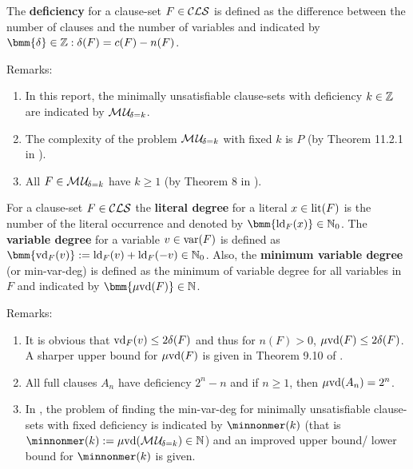 \documentclass{report}
\begin{document}
\begin{defi}\label{def:deficiency}
The \textbf{deficiency} for a clause-set $F \in \mathcal{CLS}$ is defined as the difference between the number of clauses and the number of variables and indicated by $\bmm{\delta} \in \ZZ: \delta(F)= c(F) - n(F)$.
\end{defi}
Remarks:
  \begin{enumerate}
  \item In this report, the minimally unsatisfiable clause-sets with deficiency $k \in \mathbb{Z}$ are indicated by $\mathcal{M\hspace{0.8pt}U}_{\!\delta=k}$.
  \item The complexity of the problem $\mathcal{M\hspace{0.8pt}U}_{\!\delta=k}$ with fixed $k$ is $P$ (by Theorem 11.2.1 in \cite{Kullmann2007HandbuchMU}).
  \item All $F \in \mathcal{M\hspace{0.8pt}U}_{\!\delta=k}$ have $k \ge 1$ (by Theorem 8 in \cite{DDK98}).
  \end{enumerate}

\begin{defi}\label{def:degree}
For a clause-set $F \in \mathcal{CLS}$ the \textbf{literal degree} for a literal $x \in \operatorname{lit}(F)$ is the number of the literal occurrence and denoted by $\bmm{\ldeg_F(x)} \in \NNZ$. The \textbf{variable degree} for a variable $v \in \operatorname{var}(F)$ is defined as $\bmm{\vdeg_F(v)} := \ldeg_F(v) + \ldeg_F(-v) \in \NNZ$. Also, the \textbf{minimum variable degree} (or min-var-deg) is defined as the minimum of variable degree for all variables in $F$ and indicated by $\bmm{\minvdeg(F)} \in \NN$.
\end{defi}
Remarks:
  \begin{enumerate}
  \item It is obvious that $\operatorname{vd}_F(v) \le 2 \delta(F)$ and thus for $n(F) >0$, $\operatorname{\mu\!\operatorname{vd}}(F) \le 2 \delta(F)$. A sharper upper bound for $\operatorname{\mu\!\operatorname{vd}}(F)$ is given in Theorem 9.10 of \cite{KullmannZhao2010Extremal}.
  \item All full clauses $A_n$ have deficiency $2^n - n$ and if $n \ge 1$, then  $\operatorname{\mu\!\operatorname{vd}}(A_n) =2^n$.
  \item In \cite{KullmannZhao2010Extremal}, the problem of finding the min-var-deg for minimally unsatisfiable clause-sets with fixed deficiency is indicated by $\minnonmer(k) $ (that is $\minnonmer(k)  :=  \minvdeg(\Musati{\delta=k}) \in \NN$) and an improved upper bound/ lower bound for $\minnonmer(k) $ is given.
    \end{enumerate}
    
\end{document}
